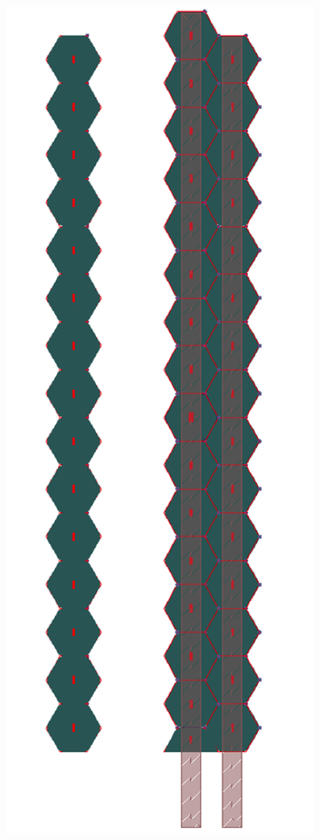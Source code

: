 \begin{figure}
	\begin{minipage}[b]{.29\textwidth}
		\includegraphics[width=\linewidth]{Calorimeter/SiliconTungstenSiD/hexagon}

\end{minipage}
\end{figure}
